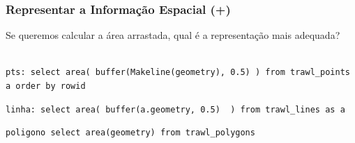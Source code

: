 \documentclass[hyperref={pdfpagelabels=true}]{beamer}
\begin{document}
\begin{frame}[fragile]
\frametitle{Representar a Informa\c{c}\~{a}o Espacial (+)}

Se queremos calcular a \'{a}rea arrastada, qual \'{e} a representa\c{c}\~{a}o mais adequada?
\\~\\

\tiny{
\pause
\begin{lstlisting}
pts: select area( buffer(Makeline(geometry), 0.5) ) from trawl_points a order by rowid
\end{lstlisting}
\pause
\begin{lstlisting}
linha: select area( buffer(a.geometry, 0.5)  ) from trawl_lines as a
\end{lstlisting}
\pause
\begin{lstlisting}
poligono select area(geometry) from trawl_polygons
\end{lstlisting}



}
\end{frame}



\end{document}

